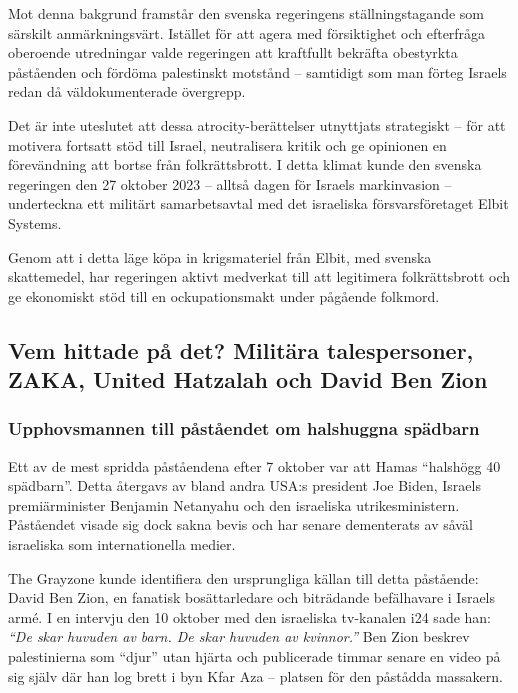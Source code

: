Mot denna bakgrund framstår den svenska regeringens ställningstagande som särskilt anmärkningsvärt. Istället för att agera med försiktighet och efterfråga oberoende utredningar valde regeringen att kraftfullt bekräfta obestyrkta påståenden och fördöma palestinskt motstånd – samtidigt som man förteg Israels redan då väldokumenterade övergrepp.

Det är inte uteslutet att dessa atrocity-berättelser utnyttjats strategiskt – för att motivera fortsatt stöd till Israel, neutralisera kritik och ge opinionen en förevändning att bortse från folkrättsbrott. I detta klimat kunde den svenska regeringen den 27 oktober 2023 – alltså dagen för Israels markinvasion – underteckna ett militärt samarbetsavtal med det israeliska försvarsföretaget Elbit Systems.

Genom att i detta läge köpa in krigsmateriel från Elbit, med svenska skattemedel, har regeringen aktivt medverkat till att legitimera folkrättsbrott och ge ekonomiskt stöd till en ockupationsmakt under pågående folkmord.

\subsection*{Vem hittade på det? Militära talespersoner, ZAKA, United Hatzalah och David Ben Zion}
\subsubsection*{Upphovsmannen till påståendet om halshuggna spädbarn}

Ett av de mest spridda påståendena efter 7 oktober var att Hamas “halshögg 40 spädbarn”. Detta återgavs av bland andra USA:s president Joe Biden, Israels premiärminister Benjamin Netanyahu och den israeliska utrikesministern. Påståendet visade sig dock sakna bevis och har senare dementerats av såväl israeliska som internationella medier.

The Grayzone kunde identifiera den ursprungliga källan till detta påstående: David Ben Zion, en fanatisk bosättarledare och biträdande befälhavare i Israels armé. I en intervju den 10 oktober med den israeliska tv-kanalen i24 sade han: \textit{“De skar huvuden av barn. De skar huvuden av kvinnor.”} Ben Zion beskrev palestinierna som “djur” utan hjärta och publicerade timmar senare en video på sig själv där han log brett i byn Kfar Aza – platsen för den påstådda massakern. 

